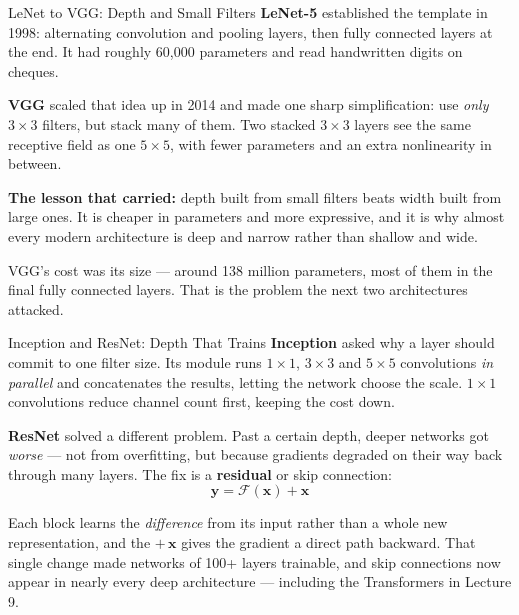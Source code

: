 \documentclass[aspectratio=169, 11pt]{beamer}
\begin{document}
\begin{frame}{LeNet to VGG: Depth and Small Filters}
  \textbf{LeNet-5} \parencite{LeCun1998} established the template in 1998: alternating
  convolution and pooling layers, then fully connected layers at the end. It had roughly 60{,}000
  parameters and read handwritten digits on cheques.

  \vspace{0.15cm}
  \textbf{VGG} \parencite{Simonyan2015} scaled that idea up in 2014 and made one sharp
  simplification: use \emph{only} $3\times3$ filters, but stack many of them. Two stacked
  $3\times3$ layers see the same receptive field as one $5\times5$, with fewer parameters and an
  extra nonlinearity in between.

  \begin{keybox}
    \textbf{The lesson that carried:} depth built from small filters beats width built from large
    ones. It is cheaper in parameters and more expressive, and it is why almost every modern
    architecture is deep and narrow rather than shallow and wide.
  \end{keybox}

  \vspace{0.1cm}
  VGG's cost was its size --- around 138 million parameters, most of them in the final fully
  connected layers. That is the problem the next two architectures attacked.
\end{frame}

\begin{frame}{Inception and ResNet: Depth That Trains}
  \textbf{Inception} \parencite{Szegedy2015} asked why a layer should commit to one filter size.
  Its module runs $1\times1$, $3\times3$ and $5\times5$ convolutions \emph{in parallel} and
  concatenates the results, letting the network choose the scale. $1\times1$ convolutions reduce
  channel count first, keeping the cost down.

  \vspace{0.15cm}
  \textbf{ResNet} \parencite{He2016} solved a different problem. Past a certain depth, deeper
  networks got \emph{worse} --- not from overfitting, but because gradients degraded on their way
  back through many layers. The fix is a \textbf{residual} or skip connection:
  \[
    \mathbf{y} = \mathcal{F}(\mathbf{x}) + \mathbf{x}
  \]
  \vspace{-0.3cm}

  Each block learns the \emph{difference} from its input rather than a whole new representation,
  and the $+\,\mathbf{x}$ gives the gradient a direct path backward. That single change made
  networks of 100+ layers trainable, and skip connections now appear in nearly every deep
  architecture --- including the Transformers in Lecture 9.
\end{frame}
\end{document}
